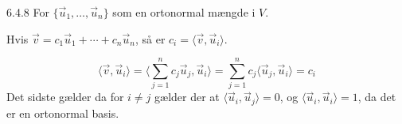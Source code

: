 \begin{saetning}{6.4.8}
	For $\{\vec{u}_1, \dotsc, \vec{u}_n\}$ som en ortonormal mængde i $V$.

	\noindent
	Hvis $\vec{v} = c_1\vec{u}_1 + \dotsb + c_n\vec{u}_n$, så er $c_i = \langle
	\vec{v},\vec{u}_i\rangle$.
\end{saetning}

\begin{bevis}
	$$\langle\vec{v},\vec{u}_i\rangle = \langle \sum_{j=1}^n
	c_j\vec{u}_j,\vec{u}_i\rangle
	= \sum_{j=1}^nc_j\langle\vec{u}_j, \vec{u}_i\rangle
	= c_i$$
	Det sidste gælder da for $i\ne j$ gælder der at $\langle\vec{u}_i,
	\vec{u}_j\rangle = 0$, og $\langle\vec{u}_i, \vec{u}_i\rangle = 1$, da det
	er en ortonormal basis.
\end{bevis}

